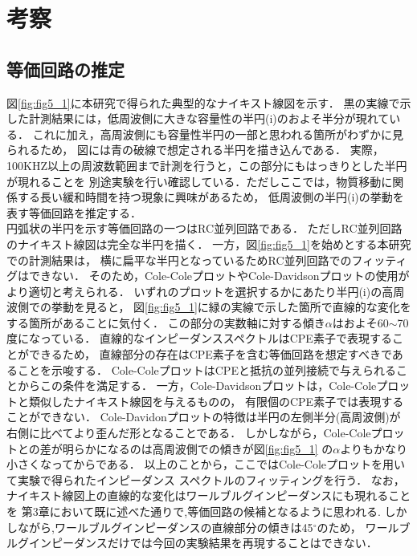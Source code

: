 \chapter{考察}
\section{等価回路の推定}
図\ref{fig:fig5_1}に本研究で得られた典型的なナイキスト線図を示す．
黒の実線で示した計測結果には，低周波側に大きな容量性の半円(i)のおよそ半分が現れている．
これに加え，高周波側にも容量性半円の一部と思われる箇所がわずかに見られるため，
図には青の破線で想定される半円を描き込んである．
実際，100KHZ以上の周波数範囲まで計測を行うと，この部分にもはっきりとした半円が現れることを
別途実験を行い確認している．ただしここでは，物質移動に関係する長い緩和時間を持つ現象に興味があるため，
低周波側の半円(i)の挙動を表す等価回路を推定する．\\

円弧状の半円を示す等価回路の一つはRC並列回路である．
ただしRC並列回路のナイキスト線図は完全な半円を描く．
一方，図\ref{fig:fig5_1}を始めとする本研究での計測結果は，
横に扁平な半円となっているためRC並列回路でのフィッティグはできない．
そのため，Cole-ColeプロットやCole-Davidsonプロットの使用がより適切と考えられる．
いずれのプロットを選択するかにあたり半円(i)の高周波側での挙動を見ると，
図\ref{fig:fig5_1}に緑の実線で示した箇所で直線的な変化をする箇所があることに気付く．
この部分の実数軸に対する傾き$\alpha$はおよそ60$\sim$70度になっている．
直線的なインピーダンススペクトルはCPE素子で表現することができるため，
直線部分の存在はCPE素子を含む等価回路を想定すべきであることを示唆する．
Cole-ColeプロットはCPEと抵抗の並列接続で与えられることからこの条件を満足する．
一方，Cole-Davidsonプロットは，Cole-Coleプロットと類似したナイキスト線図を与えるものの，
有限個のCPE素子では表現することができない．
Cole-Davidonプロットの特徴は半円の左側半分(高周波側)が右側に比べてより歪んだ形となることである．
しかしながら，Cole-Coleプロットとの差が明らかになるのは高周波側での傾きが図\ref{fig:fig5_1}
の$\alpha$よりもかなり小さくなってからである．
以上のことから，ここではCole-Coleプロットを用いて実験で得られたインピーダンス
スペクトルのフィッティングを行う．
なお，ナイキスト線図上の直線的な変化はワールブルグインピーダンスにも現れることを
第3章において既に述べた通りで,等価回路の候補となるように思われる.
しかしながら,ワールブルグインピーダンスの直線部分の傾きは45$^\circ$のため，
ワールブルグインピーダンスだけでは今回の実験結果を再現することはできない．

